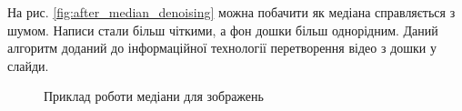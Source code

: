 На рис. \ref{fig:after_median_denoising} можна побачити як медіана справляється з шумом. Написи стали більш чіткими,
а фон дошки більш однорідним. Даний алгоритм доданий до інформаційної технології перетворення відео
з дошки у слайди.

\begin{figure}[H]
    \centering
    \caption{Приклад роботи медіани для зображень \cite{yakovlev_discrete_math_video}
    }
\end{figure}
